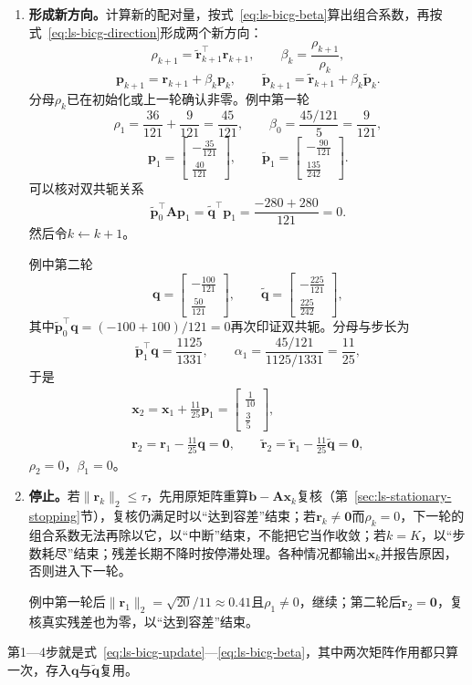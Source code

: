 \begin{enumerate}
 \item \textbf{形成新方向。}计算新的配对量，按式~\eqref{eq:ls-bicg-beta}算出组合系数，再按式~\eqref{eq:ls-bicg-direction}形成两个新方向：
 \[
  \rho_{k+1}=\widetilde{\bm r}_{k+1}^\top\bm r_{k+1},\qquad \beta_k=\frac{\rho_{k+1}}{\rho_k},
 \]
 \[
  \bm p_{k+1}=\bm r_{k+1}+\beta_k\bm p_k,\qquad
  \widetilde{\bm p}_{k+1}=\widetilde{\bm r}_{k+1}+\beta_k\widetilde{\bm p}_k .
 \]
 分母$\rho_k$已在初始化或上一轮确认非零。例中第一轮
 \[
  \rho_1=\frac{36}{121}+\frac9{121}=\frac{45}{121},\qquad \beta_0=\frac{45/121}{5}=\frac9{121},
 \]
 \[
  \bm p_1=\begin{bmatrix}-\tfrac{35}{121}\\\tfrac{40}{121}\end{bmatrix},\qquad
  \widetilde{\bm p}_1=\begin{bmatrix}-\tfrac{90}{121}\\\tfrac{135}{242}\end{bmatrix}.
 \]
 可以核对双共轭关系
 \[
  \widetilde{\bm p}_0^\top\bm A\bm p_1=\widetilde{\bm q}^\top\bm p_1=\frac{-280+280}{121}=0 .
 \]
 然后令$k\leftarrow k+1$。

 例中第二轮
 \[
  \bm q=\begin{bmatrix}-\tfrac{100}{121}\\\tfrac{50}{121}\end{bmatrix},\qquad
  \widetilde{\bm q}=\begin{bmatrix}-\tfrac{225}{121}\\\tfrac{225}{242}\end{bmatrix},
 \]
 其中$\widetilde{\bm p}_0^\top\bm q=(-100+100)/121=0$再次印证双共轭。分母与步长为
 \[
  \widetilde{\bm p}_1^\top\bm q=\frac{1125}{1331},\qquad
  \alpha_1=\frac{45/121}{1125/1331}=\frac{11}{25},
 \]
 于是
 \[
  \begin{gathered}
  \bm x_2=\bm x_1+\frac{11}{25}\bm p_1=\begin{bmatrix}\tfrac1{10}\\\tfrac35\end{bmatrix},\\
  \bm r_2=\bm r_1-\frac{11}{25}\bm q=\bm 0,\qquad
  \widetilde{\bm r}_2=\widetilde{\bm r}_1-\frac{11}{25}\widetilde{\bm q}=\bm 0,
  \end{gathered}
 \]
 $\rho_2=0$，$\beta_1=0$。

 \item \textbf{停止。}若$\lVert\bm r_{k}\rVert_2\le\tau$，先用原矩阵重算$\bm b-\bm A\bm x_{k}$复核（第~\ref{sec:ls-stationary-stopping}节），复核仍满足时以“达到容差”结束；若$\bm r_{k}\ne\bm 0$而$\rho_{k}=0$，下一轮的组合系数无法再除以它，以“中断”结束，不能把它当作收敛；若$k=K$，以“步数耗尽”结束；残差长期不降时按停滞处理。各种情况都输出$\bm x_{k}$并报告原因，否则进入下一轮。

 例中第一轮后$\lVert\bm r_1\rVert_2=\sqrt{20}/11\approx0.41$且$\rho_1\ne0$，继续；第二轮后$\bm r_2=\bm 0$，复核真实残差也为零，以“达到容差”结束。
\end{enumerate}
第1—4步就是式~\eqref{eq:ls-bicg-update}—\eqref{eq:ls-bicg-beta}，其中两次矩阵作用都只算一次，存入$\bm q$与$\widetilde{\bm q}$复用。

